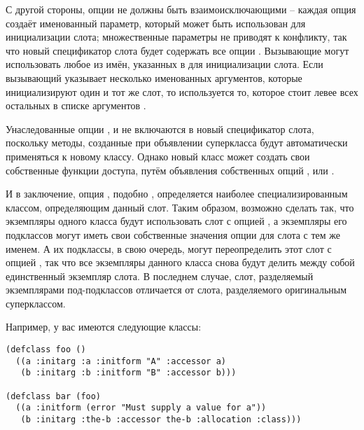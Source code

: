 С другой стороны, опции  не должны быть взаимоисключающими -- каждая опция
 создаёт именованный параметр, который может быть использован для
инициализации слота; множественные параметры не приводят к конфликту, так что новый
спецификатор слота будет содержать все опции . Вызывающие
 могут использовать любое из имён, указанных в  для
инициализации слота. Если вызывающий указывает несколько именованных аргументов, которые
инициализируют один и тот же слот, то используется то, которое стоит левее всех остальных
в списке аргументов .

Унаследованные опции ,  и  не включаются в
новый спецификатор слота, поскольку методы, созданные при объявлении суперкласса будут
автоматически применяться к новому классу.  Однако новый класс может создать свои
собственные функции доступа, путём объявления собственных опций ,
 или .

И в заключение, опция , подобно , определяется наиболее
специализированным классом, определяющим данный слот.  Таким образом, возможно сделать
так, что экземпляры одного класса будут использовать слот с опцией , а
экземпляры его подклассов могут иметь свои собственные значения опции  для
слота с тем же именем.  А их подклассы, в свою очередь, могут переопределить этот слот с
опцией , так что все экземпляры данного класса снова будут делить между собой
единственный экземпляр слота.  В последнем случае, слот, разделяемый экземплярами
под-подклассов отличается от слота, разделяемого оригинальным суперклассом.

Например, у вас имеются следующие классы:

\begin{lstlisting}
(defclass foo ()
  ((a :initarg :a :initform "A" :accessor a)
   (b :initarg :b :initform "B" :accessor b)))

(defclass bar (foo)
  ((a :initform (error "Must supply a value for a"))
   (b :initarg :the-b :accessor the-b :allocation :class)))
\end{lstlisting}

